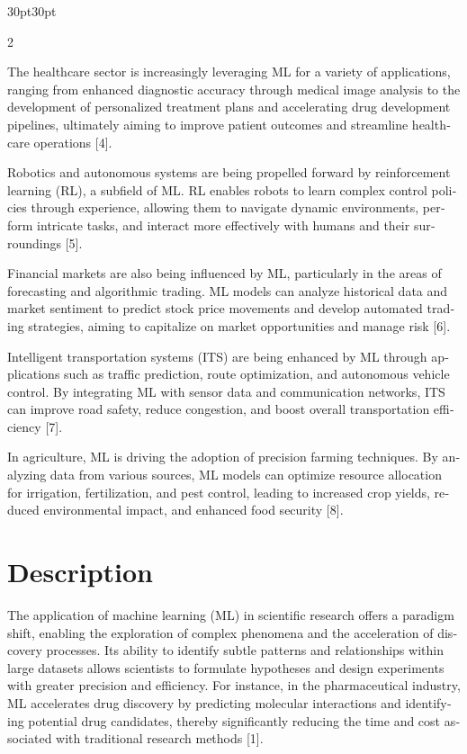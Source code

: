 \documentclass{article}
\begin{document}
\begin{adjustwidth}{30pt}{30pt}
\begin{multicols}{2}
\begin{otherlanguage}{english}
The healthcare sector is increasingly leveraging ML for a variety of applications, ranging from enhanced diagnostic accuracy through medical image analysis to the development of personalized treatment plans and accelerating drug development pipelines, ultimately aiming to improve patient outcomes and streamline healthcare operations [4].

Robotics and autonomous systems are being propelled forward by reinforcement learning (RL), a subfield of ML. RL enables robots to learn complex control policies through experience, allowing them to navigate dynamic environments, perform intricate tasks, and interact more effectively with humans and their surroundings [5].

Financial markets are also being influenced by ML, particularly in the areas of forecasting and algorithmic trading. ML models can analyze historical data and market sentiment to predict stock price movements and develop automated trading strategies, aiming to capitalize on market opportunities and manage risk [6].

Intelligent transportation systems (ITS) are being enhanced by ML through applications such as traffic prediction, route optimization, and autonomous vehicle control. By integrating ML with sensor data and communication networks, ITS can improve road safety, reduce congestion, and boost overall transportation efficiency [7].

In agriculture, ML is driving the adoption of precision farming techniques. By analyzing data from various sources, ML models can optimize resource allocation for irrigation, fertilization, and pest control, leading to increased crop yields, reduced environmental impact, and enhanced food security [8].
\end{otherlanguage}

\vspace*{-0.2cm}
\section*{Description}
\vspace*{-0.4cm}

\begin{otherlanguage}{english}
The application of machine learning (ML) in scientific research offers a paradigm shift, enabling the exploration of complex phenomena and the acceleration of discovery processes. Its ability to identify subtle patterns and relationships within large datasets allows scientists to formulate hypotheses and design experiments with greater precision and efficiency. For instance, in the pharmaceutical industry, ML accelerates drug discovery by predicting molecular interactions and identifying potential drug candidates, thereby significantly reducing the time and cost associated with traditional research methods [1].


\end{otherlanguage}
\end{multicols}
\end{adjustwidth}
\end{document}

